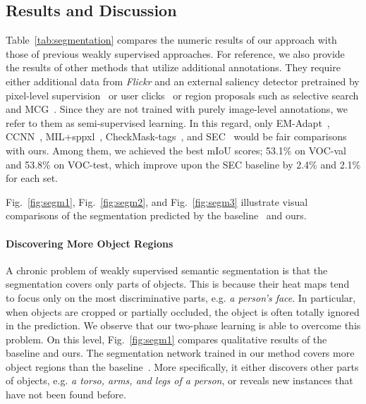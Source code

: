 \documentclass[10pt,twocolumn,letterpaper]{article}
\newcommand{\figref}[1]{Fig.~\ref{#1}}
\newcommand{\tabfref}[1]{Table~\ref{#1}}
\begin{document}
\subsection{Results and Discussion}
\tabfref{tab:segmentation} compares the numeric results of our approach with those of previous weakly supervised approaches. For reference, we also provide the results of other methods that utilize additional annotations. They require either additional data from \textit{Flickr} and an external saliency detector pretrained by pixel-level supervision~\cite{Wei15stc} or user clicks~\cite{SalehASPGA16builtin} or region proposals such as selective search and MCG~\cite{Pinheiro2015CVPR}. Since they are not trained with purely image-level annotations, we refer to them as semi-supervised learning. In this regard, only EM-Adapt~\cite{Papandreou_2015_ICCV}, CCNN~\cite{pathakICCV15ccnn}, MIL+sppxl~\cite{Pinheiro2015CVPR}, CheckMask-tags~\cite{SalehASPGA16builtin}, and SEC~\cite{kolesnikov2016seed} would be fair comparisons with ours. %
Among them, we achieved the best mIoU scores; 53.1\% on VOC-val and 53.8\% on VOC-test, which improve upon the SEC baseline by 2.4\% and 2.1\% for each set.

\figref{fig:segm1}, \figref{fig:segm2}, and \figref{fig:segm3} illustrate visual comparisons of the segmentation predicted by the baseline~\cite{kolesnikov2016seed} and ours.

\paragraph{Discovering More Object Regions}\quad A chronic problem of weakly supervised semantic segmentation is that the segmentation covers only parts of objects. This is because their heat maps tend to focus only on the most discriminative parts, e.g. \textit{a person's face}. %
In particular, when objects are cropped or partially occluded, the object is often totally ignored in the prediction.
We observe that our two-phase learning is able to overcome this problem. On this level, \figref{fig:segm1} compares qualitative results of the baseline and ours. The segmentation network trained in our method covers more object regions than the baseline~\cite{kolesnikov2016seed}. More specifically, it either discovers other parts of objects, e.g. \textit{a torso, arms, and legs of a person}, or reveals new instances that have not been found before.
\end{document}
